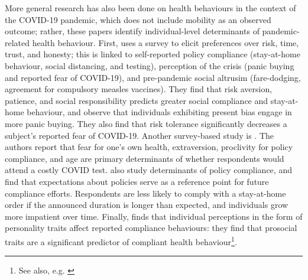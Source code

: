 \documentclass[12pt,a4]{article}
\begin{document}
More general research has also been done on health behaviours in the context of the COVID-19 pandemic, which does not include mobility as an observed outcome; rather, these papers identify individual-level determinants of pandemic-related health behaviour. First, \textcite{mullerEconomicPreferencesCompliance2021} uses a survey to elicit preferences over risk, time, trust, and honesty; this is linked to self-reported policy compliance (stay-at-home behaviour, social distancing, and testing), perception of the crisis (panic buying and reported fear of COVID-19), and pre-pandemic social altrusim (fare-dodging, agreement for compulsory measles vaccines). They find that risk aversion, patience, and social responsibility predicts greater social compliance and stay-at-home behaviour, and observe that individuals exhibiting present bias engage in more panic buying. They also find that risk tolerance significantly decreases a subject's reported fear of COVID-19. Another survey-based study is \textcite{thunstromTestingCOVID19Willful2021}. The authors report that fear for one's own health, extraversion, proclivity for policy compliance, and age are primary determinants of whether respondents would attend a costly COVID test. \textcite{brisceseExpectationsReferencePoints2020} also study determinants of policy compliance, and find that expectations about policies serve as a reference point for future compliance efforts. Respondents are less likely to comply with a stay-at-home order if the announced duration is longer than expected, and individuals grow more impatient over time. Finally, \textcite{zettlerRolePersonalityCOVID19forthcoming} finds that individual perceptions in the form of personality traits affect reported compliance behaviours: they find that prosocial traits are a significant predictor of compliant health behaviour\footnote{See also, e.g. \textcite{herrmannAntisocialPunishmentSocieties2008,almasCutthroatCapitalismCuddly2019}}.
\end{document}

